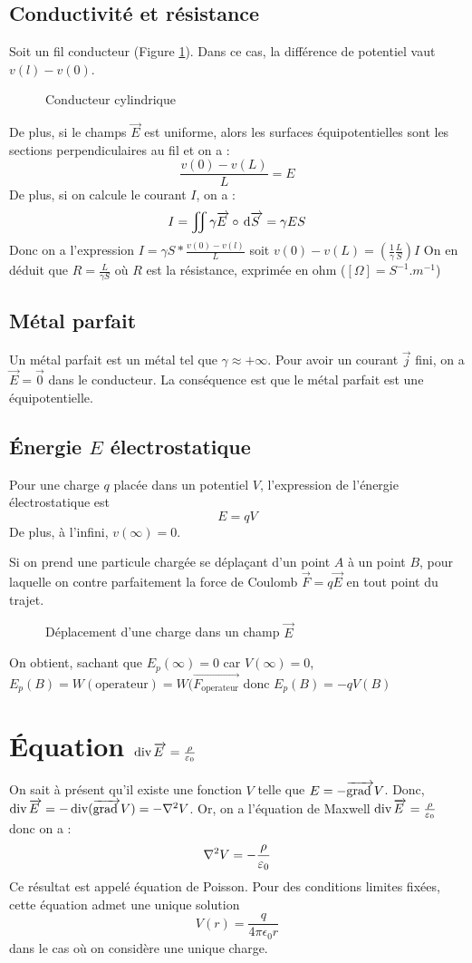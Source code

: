 \subsection{Conductivité et résistance}
Soit un fil conducteur (Figure \ref{conduct_cyl}). Dans ce cas, la différence de potentiel vaut $v(l)-v(0)$.
\begin{figure}[H]
	\centering
	\def\svgwidth{10cm}
	\vspace{0.5cm}
	
	\caption{Conducteur cylindrique}
	\label{conduct_cyl}
\end{figure}
De plus, si le champs $\vec{E}$ est uniforme, alors les surfaces équipotentielles sont les sections perpendiculaires au fil et on a :
\[
\frac{v(0)-v(L)}{L}=E
\]
De plus, si on calcule le courant $I$, on a : 
\[
I =\iint\gamma\overrightarrow{E\:}\circ\,\mathrm{d}\overrightarrow{S\:} = \gamma ES
\]
Donc on a l'expression $I=\gamma S*\frac{v(0)-v(l)}{L}$ soit $v(0)-v(L) = \left(\frac{1}{\gamma}\frac{L}{S}\right) I$
On en déduit que $R=\frac{L}{\gamma S}$ où $R$ est la résistance, exprimée en ohm ($[\Omega] = S^{-1}.m^{-1}$)

\subsection{Métal parfait}
Un métal parfait est un métal tel que $\gamma\approx+\infty$. Pour avoir un courant $\vec{j}$ fini, on a $\vec{E} = \vec{0}$ dans le conducteur. La conséquence est que le métal parfait est une équipotentielle.

\subsection{\'Energie $E$ électrostatique}
Pour une charge $q$ placée dans un potentiel $V$, l'expression de l'énergie électrostatique est
\[E=qV\]
De plus, à l'infini, $v(\infty)=0$.

Si on prend une particule chargée se déplaçant d'un point $A$ à un point $B$, pour laquelle on contre parfaitement la force de Coulomb $\vec{F}=q\vec{E}$ en tout point du trajet.
\begin{figure}[H]
	\centering
	\def\svgwidth{10cm}
	\vspace{0.5cm}
	
	\caption{Déplacement d'une charge dans un champ $\vec{E}$}
	\label{ener_elec}
\end{figure}
On obtient, sachant que $E_p(\infty)=0$ car $V(\infty)=0$, $E_p(B)=W(\text{operateur}) = W(\vec{F_\text{operateur}}$ donc $E_p(B)=-qV(B)$

\section{\'Equation $\operatorname{div}\overrightarrow{E\:}=\frac{\rho}{\varepsilon_0}$}
On sait à présent qu'il existe une fonction $V$ telle que $E=-\overrightarrow{\text{grad}\:} V$. Donc, $\operatorname{div}\overrightarrow{E\:}=-\operatorname{div}(\overrightarrow{\text{grad}\:} V) = -\nabla^2 V$. Or, on a l'équation de Maxwell $\operatorname{div}\overrightarrow{E\:}=\frac{\rho}{\varepsilon_0}$ donc on a :
\[\nabla^2 V=-\frac{\rho}{\varepsilon_0}\]
Ce résultat est appelé équation de Poisson. Pour des conditions limites fixées, cette équation admet une unique solution
\[V(r)=\frac{q}{4\pi\epsilon_0r}\]
dans le cas où on considère une unique charge.
